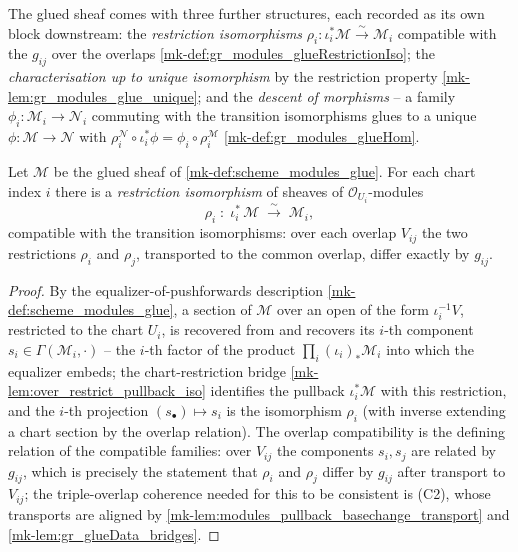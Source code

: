 \begin{definition}
  The glued sheaf comes with three further structures, each recorded as its own block
  downstream: the \emph{restriction isomorphisms} \(\rho_i : \iota_i^{*}\mathcal{M}
  \xrightarrow{\sim} \mathcal{M}_i\) compatible with the \(g_{ij}\) over the overlaps
  \ref{mk-def:gr_modules_glueRestrictionIso}; the \emph{characterisation up to unique
  isomorphism} by the restriction property \ref{mk-lem:gr_modules_glue_unique}; and the
  \emph{descent of morphisms} -- a family \(\phi_i : \mathcal{M}_i \to \mathcal{N}_i\)
  commuting with the transition isomorphisms glues to a unique \(\phi : \mathcal{M} \to
  \mathcal{N}\) with \(\rho_i^{\mathcal{N}} \circ \iota_i^{*}\phi = \phi_i \circ
  \rho_i^{\mathcal{M}}\) \ref{mk-def:gr_modules_glueHom}.
\end{definition}

\begin{definition}
  \label{mk-def:gr_modules_glueRestrictionIso}
  \lean{}
  Let \(\mathcal{M}\) be the glued sheaf of \ref{mk-def:scheme_modules_glue}. For each
  chart index \(i\) there is a \emph{restriction isomorphism} of sheaves of
  \(\mathcal{O}_{U_i}\)-modules
  \[
    \rho_i \;:\; \iota_i^{*}\,\mathcal{M} \;\xrightarrow{\ \sim\ }\; \mathcal{M}_i,
  \]
  compatible with the transition isomorphisms: over each overlap \(V_{ij}\) the two
  restrictions \(\rho_i\) and \(\rho_j\), transported to the common overlap, differ
  exactly by \(g_{ij}\).
\end{definition}
\begin{proof}
  By the equalizer-of-pushforwards description \ref{mk-def:scheme_modules_glue}, a section of
  \(\mathcal{M}\) over an open of the form \(\iota_i^{-1}V\), restricted to the chart
  \(U_i\), is recovered from and recovers its \(i\)-th component
  \(s_i \in \Gamma(\mathcal{M}_i, \cdot)\) -- the \(i\)-th factor of the product
  \(\prod_i (\iota_i)_{*}\mathcal{M}_i\) into which the equalizer embeds; the
  chart-restriction bridge \ref{mk-lem:over_restrict_pullback_iso} identifies the pullback
  \(\iota_i^{*}\mathcal{M}\) with this restriction, and the \(i\)-th projection
  \((s_\bullet) \mapsto s_i\) is the isomorphism \(\rho_i\) (with inverse extending a chart
  section by the overlap relation).
  The overlap compatibility is the defining relation of the compatible families: over
  \(V_{ij}\) the components \(s_i, s_j\) are related by \(g_{ij}\), which is precisely the
  statement that \(\rho_i\) and \(\rho_j\) differ by \(g_{ij}\) after transport to
  \(V_{ij}\); the triple-overlap coherence needed for this to be consistent is (C2),
  whose transports are aligned by \ref{mk-lem:modules_pullback_basechange_transport} and
  \ref{mk-lem:gr_glueData_bridges}.
\end{proof}


